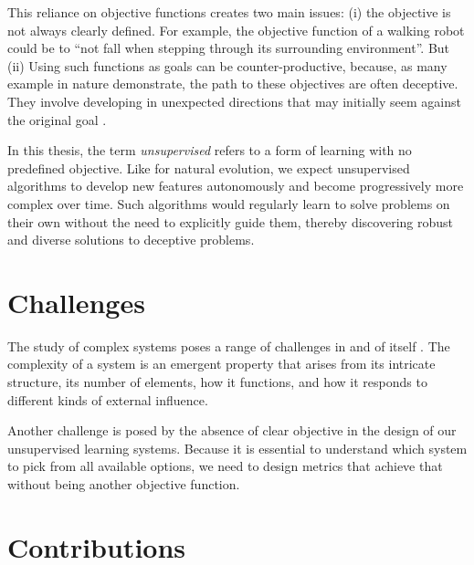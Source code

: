 This reliance on objective functions creates two main issues: (i) the objective
is not always clearly defined. For example, the objective function of a walking
robot could be to ``not fall when stepping through its surrounding
environment''. But (ii) Using such functions as goals can be counter-productive,
because, as many example in nature demonstrate, the path to these objectives are
often deceptive. They involve developing in unexpected directions that may
initially seem against the original goal \cite{stanleyWhyGreatnessCannot2015}.

In this thesis, the term \emph{unsupervised} refers to a form of learning with
no predefined objective. Like for natural evolution, we expect unsupervised
algorithms to develop new features autonomously and become progressively more
complex over time. Such algorithms would regularly learn to solve problems on
their own without the need to explicitly guide them, thereby discovering robust
and diverse solutions to deceptive problems.


\section{Challenges}

The study of complex systems poses a range of challenges in and of itself
\cite{sanmiguelChallengesComplexSystems2012}. The complexity of a system is an
emergent property that arises from its intricate structure, its number of
elements, how it functions, and how it responds to different kinds of external
influence.

Another challenge is posed by the absence of clear objective in the design of
our unsupervised learning systems. Because it is essential to understand which
system to pick from all available options, we need to design metrics that
achieve that without being another objective function.

\section{Contributions}

